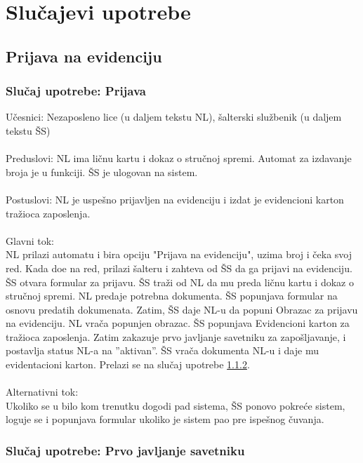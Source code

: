 \section{Slu\v cajevi upotrebe}

\subsection{Prijava na evidenciju}


\subsubsection{Slu\v caj upotrebe: Prijava}

\noindent U\v cesnici: Nezaposleno lice (u daljem tekstu NL), \v salterski slu\v zbenik (u daljem tekstu \v SS)
\\
\\ Preduslovi: NL ima li\v cnu kartu i dokaz o stru\v cnoj spremi. Automat za izdavanje broja je u funkciji. \v SS je ulogovan na sistem. 
\\
\\ Postuslovi: NL je uspe\v sno prijavljen na evidenciju i izdat je evidencioni karton tra\v zioca zaposlenja.
\\
\\ Glavni tok:
\\ NL prilazi automatu i bira opciju "Prijava na evidenciju", uzima broj i \v ceka svoj red. Kada do\dj e na red, prilazi \v salteru i zahteva od \v SS da ga prijavi na evidenciju. \v SS otvara formular za prijavu. \v SS tra\v zi od NL da mu preda li\v cnu kartu i dokaz o stru\v cnoj spremi. NL predaje potrebna dokumenta. \v SS popunjava formular na osnovu predatih dokumenata. Zatim, \v SS daje NL-u da popuni Obrazac za prijavu na evidenciju. NL vra\v ca popunjen obrazac. \v SS popunjava Evidencioni karton za tra\v zioca zaposlenja. Zatim zakazuje prvo javljanje savetniku za zapo\v sljavanje, i postavlja status NL-a na ''aktivan''. \v SS vra\v ca dokumenta NL-u i daje mu evidentacioni karton. Prelazi se na slu\v caj upotrebe \ref{su: prvo javljanje savetniku}.
\\
\\ Alternativni tok: 
\\ Ukoliko se u bilo kom trenutku dogodi pad sistema, \v SS ponovo pokre\'ce sistem, loguje se i popunjava formular ukoliko je sistem pao pre ispe\v snog \v cuvanja.


\subsubsection{Slu\v caj upotrebe: Prvo javljanje savetniku}
\label{su: prvo javljanje savetniku}

